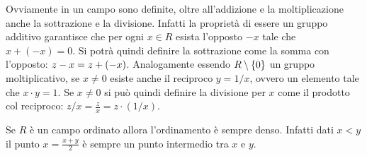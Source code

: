 Ovviamente in un campo sono definite, oltre all'addizione e la moltiplicazione anche 
la sottrazione e la divisione. 
Infatti la proprietà di essere un gruppo additivo garantisce che 
per ogni $x\in R$ esista l'opposto $-x$ tale che $x+(-x)=0$.
Si potrà quindi definire la sottrazione come la somma con l'opposto: 
$z-x = z + (-x)$.
Analogamente essendo $R\setminus{\left\{ 0 \right\}}$ un gruppo moltiplicativo,
se $x\neq 0$ esiste anche il reciproco $y=1/x$, 
ovvero un elemento tale che $x\cdot y = 1$.
Se $x\neq 0$ si può quindi definire la divisione per $x$ come 
il prodotto col reciproco: $z/x = \frac{z}{x} = z\cdot (1/x)$.

Se $R$ è un campo ordinato allora l'ordinamento è sempre denso.
Infatti dati $x<y$ il punto $x=\frac{x+y}{2}$ è sempre 
un punto intermedio tra $x$ e $y$.

%
%
